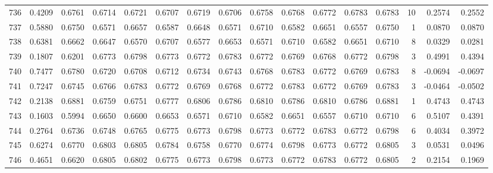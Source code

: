 \begin{tabular}{lrrrrrrrrrrrrrrr}
736 &      0.4209 &  0.6761 &  0.6714 &  0.6721 &  0.6707 &  0.6719 &  0.6706 &  0.6758 &  0.6768 &  0.6772 &   0.6783 &     0.6783 &     10 &                    0.2574 &                     0.2552 \\
737 &      0.5880 &  0.6750 &  0.6571 &  0.6657 &  0.6587 &  0.6648 &  0.6571 &  0.6710 &  0.6582 &  0.6651 &   0.6557 &     0.6750 &      1 &                    0.0870 &                     0.0870 \\
738 &      0.6381 &  0.6662 &  0.6647 &  0.6570 &  0.6707 &  0.6577 &  0.6653 &  0.6571 &  0.6710 &  0.6582 &   0.6651 &     0.6710 &      8 &                    0.0329 &                     0.0281 \\
739 &      0.1807 &  0.6201 &  0.6773 &  0.6798 &  0.6773 &  0.6772 &  0.6783 &  0.6772 &  0.6769 &  0.6768 &   0.6772 &     0.6798 &      3 &                    0.4991 &                     0.4394 \\
740 &      0.7477 &  0.6780 &  0.6720 &  0.6708 &  0.6712 &  0.6734 &  0.6743 &  0.6768 &  0.6783 &  0.6772 &   0.6769 &     0.6783 &      8 &                   -0.0694 &                    -0.0697 \\
741 &      0.7247 &  0.6745 &  0.6766 &  0.6783 &  0.6772 &  0.6769 &  0.6768 &  0.6772 &  0.6783 &  0.6772 &   0.6769 &     0.6783 &      3 &                   -0.0464 &                    -0.0502 \\
742 &      0.2138 &  0.6881 &  0.6759 &  0.6751 &  0.6777 &  0.6806 &  0.6786 &  0.6810 &  0.6786 &  0.6810 &   0.6786 &     0.6881 &      1 &                    0.4743 &                     0.4743 \\
743 &      0.1603 &  0.5994 &  0.6650 &  0.6600 &  0.6653 &  0.6571 &  0.6710 &  0.6582 &  0.6651 &  0.6557 &   0.6710 &     0.6710 &      6 &                    0.5107 &                     0.4391 \\
744 &      0.2764 &  0.6736 &  0.6748 &  0.6765 &  0.6775 &  0.6773 &  0.6798 &  0.6773 &  0.6772 &  0.6783 &   0.6772 &     0.6798 &      6 &                    0.4034 &                     0.3972 \\
745 &      0.6274 &  0.6770 &  0.6803 &  0.6805 &  0.6784 &  0.6758 &  0.6770 &  0.6774 &  0.6798 &  0.6773 &   0.6772 &     0.6805 &      3 &                    0.0531 &                     0.0496 \\
746 &      0.4651 &  0.6620 &  0.6805 &  0.6802 &  0.6775 &  0.6773 &  0.6798 &  0.6773 &  0.6772 &  0.6783 &   0.6772 &     0.6805 &      2 &                    0.2154 &                     0.1969 \\

\end{tabular}
